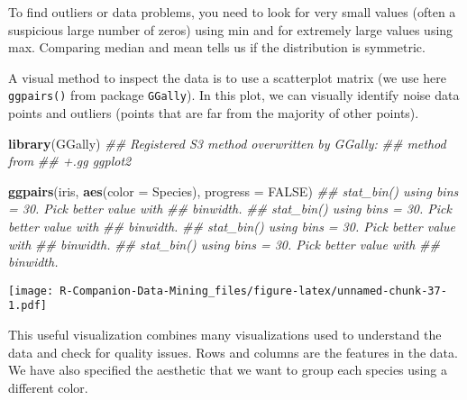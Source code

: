 \documentclass[
  notitlepage]{book}
\newenvironment{Shaded}{\begin{snugshade}}{\end{snugshade}}
\newcommand{\CommentTok}[1]{\textcolor[rgb]{0.56,0.35,0.01}{\textit{#1}}}
\newcommand{\DataTypeTok}[1]{\textcolor[rgb]{0.13,0.29,0.53}{#1}}
\newcommand{\KeywordTok}[1]{\textcolor[rgb]{0.13,0.29,0.53}{\textbf{#1}}}
\newcommand{\NormalTok}[1]{#1}
\newcommand{\OtherTok}[1]{\textcolor[rgb]{0.56,0.35,0.01}{#1}}
\begin{document}
To find outliers or data problems, you need to look for very small
values (often a suspicious large number of zeros) using min and for
extremely large values using max. Comparing median and mean tells us if
the distribution is symmetric.

A visual method to inspect the data is to use a scatterplot matrix (we
use here \texttt{ggpairs()} from package \texttt{GGally}). In this plot, we can
visually identify noise data points and outliers (points that are far
from the majority of other points).

\begin{Shaded}
\begin{Highlighting}[]
\KeywordTok{library}\NormalTok{(GGally)}
\CommentTok{\#\# Registered S3 method overwritten by \textquotesingle{}GGally\textquotesingle{}:}
\CommentTok{\#\#   method from   }
\CommentTok{\#\#   +.gg   ggplot2}
\end{Highlighting}
\end{Shaded}

\begin{Shaded}
\begin{Highlighting}[]
\KeywordTok{ggpairs}\NormalTok{(iris, }\KeywordTok{aes}\NormalTok{(}\DataTypeTok{color =}\NormalTok{ Species), }\DataTypeTok{progress =} \OtherTok{FALSE}\NormalTok{)}
\CommentTok{\#\# \textasciigrave{}stat\_bin()\textasciigrave{} using \textasciigrave{}bins = 30\textasciigrave{}. Pick better value with}
\CommentTok{\#\# \textasciigrave{}binwidth\textasciigrave{}.}
\CommentTok{\#\# \textasciigrave{}stat\_bin()\textasciigrave{} using \textasciigrave{}bins = 30\textasciigrave{}. Pick better value with}
\CommentTok{\#\# \textasciigrave{}binwidth\textasciigrave{}.}
\CommentTok{\#\# \textasciigrave{}stat\_bin()\textasciigrave{} using \textasciigrave{}bins = 30\textasciigrave{}. Pick better value with}
\CommentTok{\#\# \textasciigrave{}binwidth\textasciigrave{}.}
\CommentTok{\#\# \textasciigrave{}stat\_bin()\textasciigrave{} using \textasciigrave{}bins = 30\textasciigrave{}. Pick better value with}
\CommentTok{\#\# \textasciigrave{}binwidth\textasciigrave{}.}
\end{Highlighting}
\end{Shaded}

\texttt{[image: R-Companion-Data-Mining\_files/figure-latex/unnamed-chunk-37-1.pdf]}

This useful visualization combines many visualizations used to understand the
data and check for quality issues. Rows and columns are the features in the data.
We have also specified the aesthetic that we want to group each species using a different color.
\end{document}
